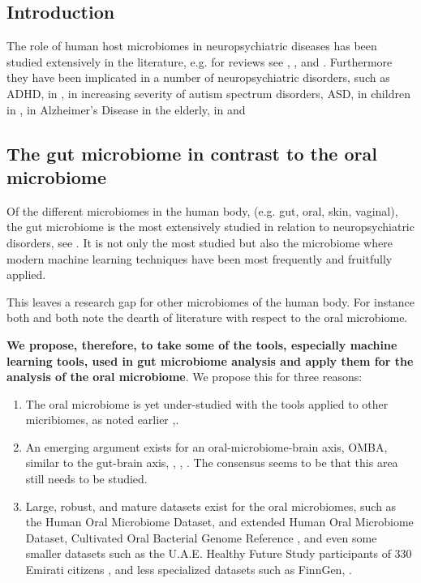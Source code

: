 \documentclass{article}
\begin{document}
\begin{multicols}{2}
\section{Introduction}
The role of human host microbiomes in neuropsychiatric diseases has been studied extensively in the literature, e.g. for reviews see \cite{goswami_role_2021}, \cite{hashimoto_emerging_2023}, and \cite{bonnechere}. Furthermore they have been implicated in a number of neuropsychiatric disorders, such as ADHD, in \cite{bull-larsen_potential_2019}, in increasing severity of autism spectrum disorders, ASD, in children in \cite{TOMOVA2015179}, in Alzheimer's Disease in the elderly, in \cite{yk_microbiota-gut-brain_2018} and \cite{escobar_influence_2022}
\subsection{The gut microbiome in contrast to the oral microbiome}
Of the different microbiomes in the human body, (e.g. gut, oral, skin, vaginal), the gut microbiome is the most extensively studied in relation to neuropsychiatric disorders, see \cite{sorboni_comprehensive_2022}. It is not only the most studied but also the microbiome where modern machine learning techniques have been most frequently and fruitfully applied. 

This leaves a research gap for other microbiomes of the human body. For instance both \cite{goswami_role_2021} and \cite{tao_relationship_2024} both note the dearth of literature with respect to the oral microbiome.

\textbf{We propose, therefore, to take some of the tools, especially machine learning tools, used in gut microbiome analysis and apply them for the analysis of the oral microbiome}. We propose this for three reasons:

\begin{enumerate}[label = \roman*.]
	\item The oral microbiome is yet under-studied with the tools applied to other micribiomes, as noted earlier \cite{goswami_role_2021},\cite{tao_relationship_2024}.
	\item An emerging argument exists for an oral-microbiome-brain axis, OMBA, similar to the gut-brain axis, \cite{bowland_oral-microbiome-brain_2022}, \cite{xi_coming_2024}, \cite{y_did_2020}. The consensus seems to be that this area still needs to be studied.
	\item Large, robust, and mature datasets exist for the oral microbiomes, such as the Human Oral Microbiome Dataset, and extended Human Oral Microbiome Dataset\cite{homd}, Cultivated Oral Bacterial Genome Reference \cite{li_catalog_2023}, and even some smaller datasets such as the U.A.E. Healthy Future Study participants of 330 Emirati citizens \cite{noauthor_human_nodate}, and less specialized datasets such as FinnGen, \cite{noauthor_finngen_nodate}.
\end{enumerate}

\end{multicols}
\end{document}
